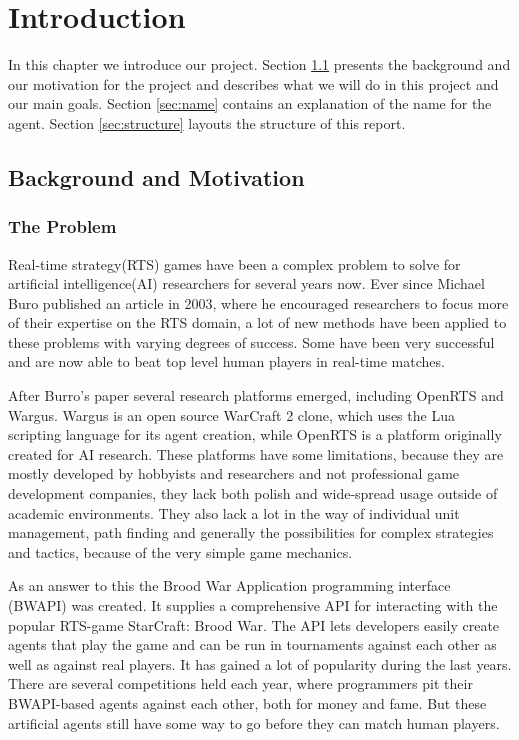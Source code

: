 
\chapter{Introduction}
In this chapter we introduce our project. Section \ref{sec:background} presents the background and our motivation for the project and describes what we will do in this project and our main goals. Section \ref{sec:name} contains an explanation of the name for the agent. Section \ref{sec:structure} layouts the structure of this report.

\section{Background and Motivation}
\label{sec:background}

\subsection{The Problem}
Real-time strategy(RTS) games have been a complex problem to solve for artificial intelligence(AI) researchers for several years now. Ever since Michael Buro published an article in 2003\cite{buro2003real}, where he encouraged researchers to focus more of their expertise on the RTS domain, a lot of new methods have been applied to these problems with varying degrees of success. Some have been very successful and are now able to beat top level human players in real-time matches.\cite{campbell2002deep}

After Burro's paper several research platforms emerged, including OpenRTS\cite{buro2003orts} and Wargus\cite{wargus}. Wargus is an open source WarCraft 2 clone, which uses the Lua scripting language for its agent creation, while OpenRTS is a platform originally created for AI research. These platforms have some limitations, because they are mostly developed by hobbyists and researchers and not professional game development companies, they lack both polish and wide-spread usage outside of academic environments. They also lack a lot in the way of individual unit management, path finding and generally the possibilities for complex strategies and tactics, because of the very simple game mechanics.

As an answer to this the Brood War Application programming interface (BWAPI) was created. It supplies a comprehensive API for interacting with the popular RTS-game StarCraft: Brood War. The API lets developers easily create agents that play the game and can be run in tournaments against each other as well as against real players. It has gained a lot of popularity during the last years.\cite{bwapi} There are several competitions held each year, where programmers pit their BWAPI-based agents against each other, both for money and fame.\cite{sscait} But these artificial agents still have some way to go before they can match human players.\cite{eisbotvsfong}

